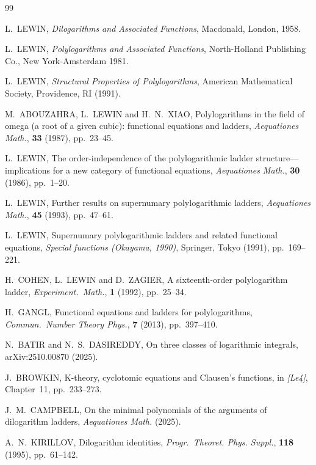 \documentclass[12pt]{article}
\begin{document}
{\begin{thebibliography}{99}

 L.\ LEWIN, 
 \textit{Dilogarithms and Associated Functions}, 
 Macdonald, London, 1958. 

 L.\ LEWIN, 
 \emph{Polylogarithms and Associated Functions}, 
 North-Holland Publishing Co., New York-Amsterdam 1981. 

 L.\ LEWIN, 
 \emph{Structural Properties of Polylogarithms}, 
 American Mathematical Society, Providence, RI (1991). 

 M.\ ABOUZAHRA, L.\ LEWIN and H.\ N.\ XIAO, 
 Polylogarithms in the field of omega (a root of a given cubic): functional equations and ladders, 
 \textit{Aequationes Math.}, \textbf{33} (1987), pp.\ 23--45. 

 L.\ LEWIN, 
 The order-independence of the polylogarithmic ladder structure---implications for a new category 
 of functional equations, 
 \textit{Aequationes Math.}, \textbf{30} (1986), pp.\ 1--20. 

 L.\ LEWIN, 
 Further results on supernumary polylogarithmic ladders, 
 \textit{Aequationes Math.}, \textbf{45} (1993), pp.\ 47--61. 

 L.\ LEWIN, 
 Supernumary polylogarithmic ladders and related functional equations, 
 \textit{Special functions ({O}kayama, 1990)}, 
 Springer, Tokyo (1991), pp.\ 169--221. 

 H.\ COHEN, L.\ LEWIN and D.\ ZAGIER, 
 A sixteenth-order polylogarithm ladder, 
 \textit{Experiment.\ Math.}, \textbf{1} (1992), pp.\ 25--34. 

 H.\ GANGL, 
 Functional equations and ladders for polylogarithms, 
 \textit{Commun.\ Number Theory Phys.}, \textbf{7} (2013), pp.\ 397--410. 


N.\ BATIR and N.\ S.\ DASIREDDY,
On three classes of logarithmic integrals,
arXiv:2510.00870 (2025).


J.\ BROWKIN,
K-theory, cyclotomic equations and Clausen's functions,
in \emph{[Le4]}, Chapter~11, pp.~233--273.


 J.\ M.\ CAMPBELL, 
 On the minimal polynomials of the arguments of dilogarithm ladders, 
 \textit{Aequationes Math.} (2025). 

 A.\ N.\ KIRILLOV, 
 Dilogarithm identities, 
 \textit{Progr.\ Theoret. Phys. Suppl.}, \textbf{118} (1995), pp.\ 61--142. 


\end{thebibliography}}
\end{document}
